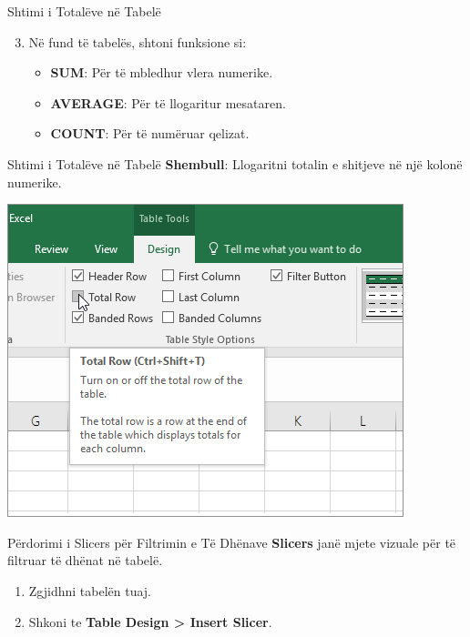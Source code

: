 \documentclass[
  ignorenonframetext,
]{beamer}
\begin{document}
\begin{frame}{Shtimi i Totalëve në Tabelë}
\label{shtimi-i-totaluxebve-nuxeb-tabeluxeb-1}
\begin{enumerate}
\setcounter{enumi}{2}
\item
  Në fund të tabelës, shtoni funksione si:

  \begin{itemize}
  \item
    \textbf{SUM}: Për të mbledhur vlera numerike.
  \item
    \textbf{AVERAGE}: Për të llogaritur mesataren.
  \item
    \textbf{COUNT}: Për të numëruar qelizat.
  \end{itemize}
\end{enumerate}
\end{frame}

\begin{frame}{Shtimi i Totalëve në Tabelë}
\label{shtimi-i-totaluxebve-nuxeb-tabeluxeb-2}
\textbf{Shembull}: Llogaritni totalin e shitjeve në një kolonë numerike.

\includegraphics{./images/excel16.png}
\end{frame}

\begin{frame}{Përdorimi i Slicers për Filtrimin e Të Dhënave}
\label{puxebrdorimi-i-slicers-puxebr-filtrimin-e-tuxeb-dhuxebnave}
\textbf{Slicers} janë mjete vizuale për të filtruar të dhënat në tabelë.

\begin{enumerate}
\item
  Zgjidhni tabelën tuaj.
\item
  Shkoni te \textbf{Table Design \textgreater{} Insert Slicer}.
\end{enumerate}
\end{frame}
\end{document}
